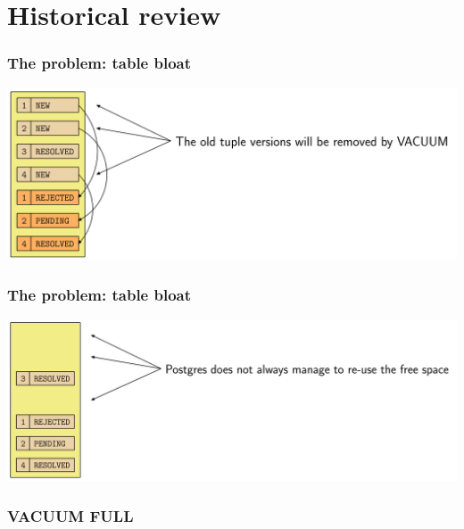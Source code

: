 \section{Historical review}

\begin{frame}
	\frametitle{The problem: table bloat}
    \includegraphics[height=\sizeforimages\textheight]{images/bloat_01.png}
\end{frame}

\begin{frame}
	\frametitle{The problem: table bloat}
    \includegraphics[height=\sizeforimages\textheight]{images/bloat_02.png}
\end{frame}

\begin{frame}
	\frametitle{VACUUM FULL}
\end{frame}


